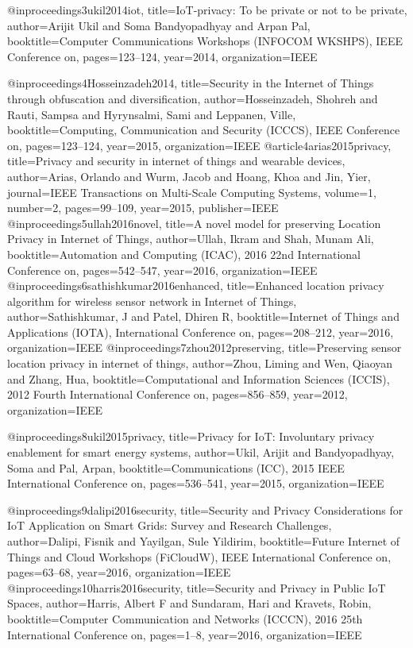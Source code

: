 {{@inproceedings{3ukil2014iot,
	title={{I}o{T}-privacy: To be private or not to be private},
	author={Arijit Ukil and Soma Bandyopadhyay and Arpan Pal},
	booktitle={Computer Communications Workshops (INFOCOM WKSHPS), IEEE Conference on},
	pages={123--124},
	year={2014},
	organization={IEEE}
}

@inproceedings{4Hosseinzadeh2014,
	title={Security in the Internet of Things through obfuscation and diversification},
	author={Hosseinzadeh, Shohreh and Rauti, Sampsa and Hyrynsalmi, Sami and Leppanen, Ville},
	booktitle={Computing, Communication and Security (ICCCS), IEEE Conference on},
	pages={123--124},
	year={2015},
	organization={IEEE}
}
@article{4arias2015privacy,
	title={Privacy and security in internet of things and wearable devices},
	author={Arias, Orlando and Wurm, Jacob and Hoang, Khoa and Jin, Yier},
	journal={IEEE Transactions on Multi-Scale Computing Systems},
	volume={1},
	number={2},
	pages={99--109},
	year={2015},
	publisher={IEEE}
}
@inproceedings{5ullah2016novel,
	title={A novel model for preserving Location Privacy in Internet of Things},
	author={Ullah, Ikram and Shah, Munam Ali},
	booktitle={Automation and Computing (ICAC), 2016 22nd International Conference on},
	pages={542--547},
	year={2016},
	organization={IEEE}
}
@inproceedings{6sathishkumar2016enhanced,
	title={Enhanced location privacy algorithm for wireless sensor network in Internet of Things},
	author={Sathishkumar, J and Patel, Dhiren R},
	booktitle={Internet of Things and Applications (IOTA), International Conference on},
	pages={208--212},
	year={2016},
	organization={IEEE}
}
@inproceedings{7zhou2012preserving,
	title={Preserving sensor location privacy in internet of things},
	author={Zhou, Liming and Wen, Qiaoyan and Zhang, Hua},
	booktitle={Computational and Information Sciences (ICCIS), 2012 Fourth International Conference on},
	pages={856--859},
	year={2012},
	organization={IEEE}
}

@inproceedings{8ukil2015privacy,
	title={Privacy for {I}o{T}: Involuntary privacy enablement for smart energy systems},
	author={Ukil, Arijit and Bandyopadhyay, Soma and Pal, Arpan},
	booktitle={Communications (ICC), 2015 IEEE International Conference on},
	pages={536--541},
	year={2015},
	organization={IEEE}
}

@inproceedings{9dalipi2016security,
	title={Security and Privacy Considerations for {I}o{T} Application on Smart Grids: Survey and Research Challenges},
	author={Dalipi, Fisnik and Yayilgan, Sule Yildirim},
	booktitle={Future Internet of Things and Cloud Workshops (FiCloudW), IEEE International Conference on},
	pages={63--68},
	year={2016},
	organization={IEEE}
}
@inproceedings{10harris2016security,
	title={Security and Privacy in Public {I}o{T} Spaces},
	author={Harris, Albert F and Sundaram, Hari and Kravets, Robin},
	booktitle={Computer Communication and Networks (ICCCN), 2016 25th International Conference on},
	pages={1--8},
	year={2016},
	organization={IEEE}
}

}}
